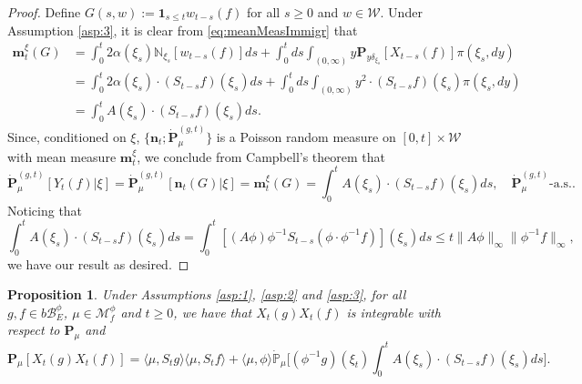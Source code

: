 \documentclass[UTF8]{pkuthss}
\theoremstyle{plain}
\newtheorem{prop}[thm]{Proposition}
\theoremstyle{definition}
\numberwithin{equation}{section}
\begin{document}
\begin{proof}
	Define $G(s,w) := \mathbf 1_{s\leq t} w_{t-s}(f)$ for all $s \geq 0$ and $w \in \mathcal W$.
	Under Assumption \ref{asp:3}, it is clear from \eqref{eq:meanMeasImmigr} that
\[\begin{split}
	\mathbf m_t^\xi(G)
	&= \int_0^t 2 \alpha(\xi_s) \mathbb N_{\xi_s}[w_{t-s}(f)]ds + \int_0^t ds \int_{(0,\infty)} y \mathbf P_{y \delta_{\xi_s}}[X_{t-s}(f)] \pi(\xi_s,dy) \\
	&= \int_0^t 2 \alpha(\xi_s)\cdot (S_{t-s}f)(\xi_s) ds + \int_0^t ds \int_{(0,\infty)} y^2 \cdot (S_{t-s} f)(\xi_s) \pi(\xi_s, dy)\\
    &= \int_0^t A(\xi_s) \cdot (S_{t-s} f) (\xi_s) ds.
\end{split}\]
	Since, conditioned on $\xi$,  $\{\mathbf n_t;\dot{\mathbf P}^{(g,t)}_\mu\}$ is a
	Poisson random measure on $[0,t] \times \mathcal W$
	with mean measure $\mathbf m_t^\xi$, we conclude from Campbell's theorem that
\[
	\dot{\mathbf P}^{(g,t)}_{\mu}[Y_t(f)|\xi]
	= \dot{\mathbf P}^{(g,t)}_{\mu} [\mathbf n_t(G)|\xi]
	= \mathbf m_t^\xi(G)
    = \int_0^t A(\xi_s) \cdot (S_{t-s} f) (\xi_s) ds,
	\quad \dot{\mathbf P}^{(g,t)}_{\mu} \text{-a.s.}.
\]
	Noticing that
\[
   	\int_0^t A(\xi_s) \cdot (S_{t-s} f) (\xi_s) ds
	 = \int_0^t [(A \phi) \phi^{-1} S_{t-s}(\phi \cdot \phi^{-1} f)](\xi_s)ds
	\leq t \|A\phi\|_\infty \|\phi^{-1}f\|_\infty,
\]
	we have our result as desired.
\end{proof}
\begin{prop}\label{prop:covanrance}
	Under Assumptions \ref{asp:1}, \ref{asp:2} and \ref{asp:3}, for all $g,f\in b\mathscr B^\phi_E$, $\mu \in \mathcal M^\phi_f$
	and $t\geq 0$,
	we have that $X_t(g)X_t(f)$ is integrable with respect to $\mathbf P_\mu$ and
\begin{equation}\label{eq:covanrance}
	\mathbf P_\mu[X_t(g) X_t( f)]
	= \langle\mu, S_t g \rangle \langle\mu, S_t f\rangle + \langle\mu, \phi\rangle \dot{\mathbb P}_{\mu} \Big[(\phi^{-1} g)(\xi_t) \int_0^t A(\xi_s) \cdot (S_{t-s} f)(\xi_s) ds\Big].
\end{equation}
\end{prop}
\end{document}
